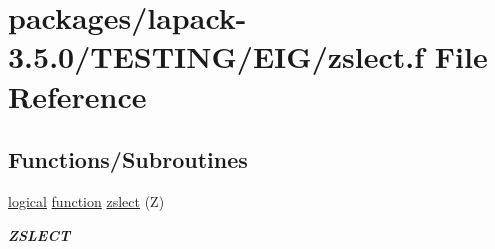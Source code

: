 \hypertarget{zslect_8f}{}\section{packages/lapack-\/3.5.0/\+T\+E\+S\+T\+I\+N\+G/\+E\+I\+G/zslect.f File Reference}
\label{zslect_8f}
\subsection*{Functions/\+Subroutines}
\begin{DoxyCompactItemize}
\item 
\hyperlink{tnc_8c_aa7b64cdf39500931f7b333343791a104}{logical} \hyperlink{afunc_8m_a7b5e596df91eadea6c537c0825e894a7}{function} \hyperlink{group__complex16__eig_ga5f37daf9fec134eae34b3575fff5e7c6}{zslect} (Z)
\begin{DoxyCompactList}\small\item\em {\bfseries Z\+S\+L\+E\+C\+T} \end{DoxyCompactList}\end{DoxyCompactItemize}
